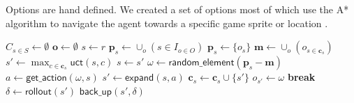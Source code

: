 Options are hand defined. We created a set of options most of which use the A*
algorithm to navigate the agent towards a specific game sprite or location \cn.

\begin{algorithm}
	\caption{$\mathsf{O-MCTS}(O, r, t, d)$}
	\label{alg:omcts}
	\begin{algorithmic}[1]
		\State $C_{s \in S} \gets \emptyset$ 
		\State $\mathbf{o} \gets \emptyset$ 
		 \label{alg:omcts:mainloop}
			\State $s \gets r$ 
			 \label{alg:omcts:innerloop}
				 \label{alg:omcts:sp} 
					\State $\mathbf{p}_s \gets \cup_o (s \in I_{o \in O})$ 
				\Else
					\State $\mathbf{p}_s \gets \{o_s\}$ 
				\EndIf \label{alg:omcts:ep}
				\State $\mathbf{m} \gets \cup_o (o_{s \in \mathbf{c}_s})$ 
				 
					\State $s' \gets \max_{c \in \mathbf{c}_s} \mathsf{uct}(s, c)$ \label{alg:omcts:uct} 
					\State $s \gets s'$ \label{alg:omcts:ss} 
				\Else \label{alg:omcts:sexpand}
					\State $\omega \gets \mathsf{random\_element}(\mathbf{p}_s - \mathbf{m})$ 
					\State $a \gets \mathsf{get\_action}(\omega, s)$ 
					\State $s' \gets \mathsf{expand}(s, a)$ 
						\State $\mathbf{c}_s \gets \mathbf{c}_s \cup \{s'\}$ 
					\State $o_{s'} \gets \omega$
					\State \textbf{break} \label{alg:omcts:break}
				\EndIf \label{alg:omcts:eexpand}
			\EndWhile
			\State $\delta \gets \mathsf{rollout}(s')$ \label{alg:omcts:rollout}
			\State $\mathsf{back\_up}(s', \delta)$ \label{alg:omcts:backup}
		\EndWhile
		\State {}
	\end{algorithmic}
\end{algorithm}
